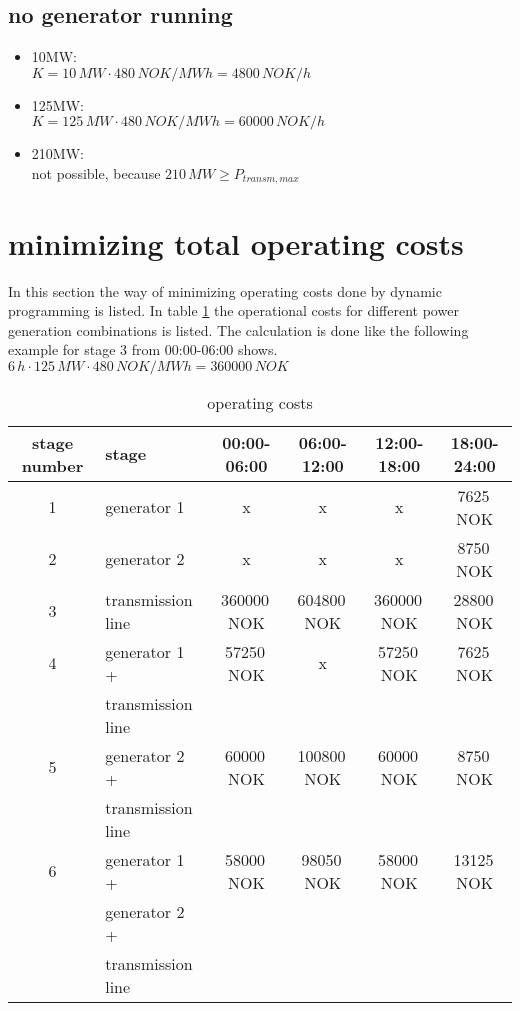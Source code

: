 \documentclass{article}
\begin{document}
		\subsection{no generator running}
			\begin{itemize}
				\item 10MW:\\
					$K=10\,MW\cdot 480\,NOK/MWh=4800\,NOK/h$
				\item 125MW:\\
					$K=125\,MW\cdot 480\,NOK/MWh=60000\,NOK/h$
				\item 210MW:\\
					not possible, because $210\,MW\geq P_{transm,max}$
			\end{itemize}
	\section{minimizing total operating costs}
In this section the way of minimizing operating costs done by dynamic programming is listed. In table \ref{tab:opcost} the operational costs for different power generation combinations is listed. The calculation is done like the following example for stage 3 from 00:00-06:00 shows.
$6\,h\cdot 125\,MW\cdot 480\,NOK/MWh=360000\,NOK$
	\begin{table}[hbt!]
\begin{center}
\begin{tabular}[h]{|c|l||c|c|c|c|}
\hline 
stage number & stage 						&				00:00-06:00		&	06:00-12:00		&		12:00-18:00		&		18:00-24:00\\
\hline
\hline
1 & generator 1					&				x				&	x				&		x				&		7625\,NOK\\
\hline
2 & generator 2					&				x				&	x				&		x				&		8750\,NOK\\
\hline
3 & transmission line			&				360000\,NOK 	& 	604800\,NOK 	& 		360000\,NOK 	& 		28800\,NOK\\
\hline
4 & generator 1 + 				&				57250\,NOK		&	x				&		57250\,NOK		&		7625\,NOK\\
  & transmission line			&								&					&						&				\\
\hline
5 & generator 2 +				&				60000\,NOK		&	100800\,NOK		&		60000\,NOK		&		8750\,NOK\\
  & transmission line			&								&					&						&				\\
\hline
6 & generator 1 +				&				58000\,NOK		&	98050\,NOK		&		58000\,NOK		&		13125\,NOK\\
  & generator 2 +				&								&					&						&				\\
  & transmission line			&								&					&						&				\\
\hline
\end{tabular}
\caption{operating costs}\label{tab:opcost}
\end{center}
\end{table}
\end{document}
